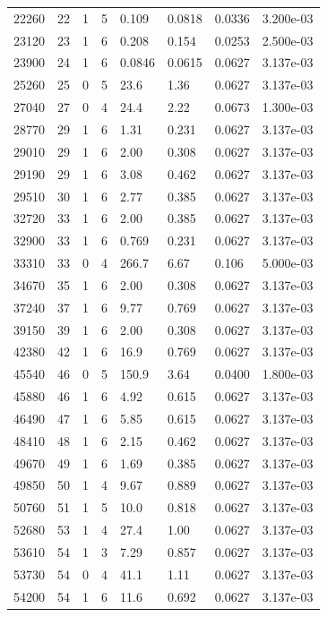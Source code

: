 \documentclass[preview]{standalone}
\begin{document}
{{\begin{tabular}{L{1.2cm}C{1.2cm} C{0.3cm}C{0.5cm} C{1.4cm}C{1.4cm} C{1.4cm}C{1.4cm}}
  22260  &    22  & 1     &  5 &  0.109  & 0.0818  & 0.0336 &  3.200e-03   \\ 
  23120  &    23  & 1     &  6 &  0.208  & 0.154  & 0.0253 &  2.500e-03   \\ 
  23900  &    24  & 1     &  6 &  0.0846  & 0.0615  & 0.0627 &  3.137e-03   \\ 
  25260  &    25  & 0     &  5 &  23.6  & 1.36  & 0.0627 &  3.137e-03   \\ 
  27040  &    27  & 0     &  4 &  24.4  & 2.22  & 0.0673 &  1.300e-03   \\ 
  28770  &    29  & 1     &  6 &  1.31  & 0.231  & 0.0627 &  3.137e-03   \\ 
  29010  &    29  & 1     &  6 &  2.00  & 0.308  & 0.0627 &  3.137e-03   \\ 
  29190  &    29  & 1     &  6 &  3.08  & 0.462  & 0.0627 &  3.137e-03   \\ 
  29510  &    30  & 1     &  6 &  2.77  & 0.385  & 0.0627 &  3.137e-03   \\ 
  32720  &    33  & 1     &  6 &  2.00  & 0.385  & 0.0627 &  3.137e-03   \\ 
  32900  &    33  & 1     &  6 &  0.769  & 0.231  & 0.0627 &  3.137e-03   \\ 
  33310  &    33  & 0     &  4 &  266.7  & 6.67  & 0.106 &  5.000e-03   \\ 
  34670  &    35  & 1     &  6 &  2.00  & 0.308  & 0.0627 &  3.137e-03   \\ 
  37240  &    37  & 1     &  6 &  9.77  & 0.769  & 0.0627 &  3.137e-03   \\ 
  39150  &    39  & 1     &  6 &  2.00  & 0.308  & 0.0627 &  3.137e-03   \\ 
  42380  &    42  & 1     &  6 &  16.9  & 0.769  & 0.0627 &  3.137e-03   \\ 
  45540  &    46  & 0     &  5 &  150.9  & 3.64  & 0.0400 &  1.800e-03   \\ 
  45880  &    46  & 1     &  6 &  4.92  & 0.615  & 0.0627 &  3.137e-03   \\ 
  46490  &    47  & 1     &  6 &  5.85  & 0.615  & 0.0627 &  3.137e-03   \\ 
  48410  &    48  & 1     &  6 &  2.15  & 0.462  & 0.0627 &  3.137e-03   \\ 
  49670  &    49  & 1     &  6 &  1.69  & 0.385  & 0.0627 &  3.137e-03   \\ 
  49850  &    50  & 1     &  4 &  9.67  & 0.889  & 0.0627 &  3.137e-03   \\ 
  50760  &    51  & 1     &  5 &  10.0  & 0.818  & 0.0627 &  3.137e-03   \\ 
  52680  &    53  & 1     &  4 &  27.4  & 1.00  & 0.0627 &  3.137e-03   \\ 
  53610  &    54  & 1     &  3 &  7.29  & 0.857  & 0.0627 &  3.137e-03   \\ 
  53730  &    54  & 0     &  4 &  41.1  & 1.11  & 0.0627 &  3.137e-03   \\ 
  54200  &    54  & 1     &  6 &  11.6  & 0.692  & 0.0627 &  3.137e-03   \\ 
\hline 
\end{tabular} 

}}
\end{document}
